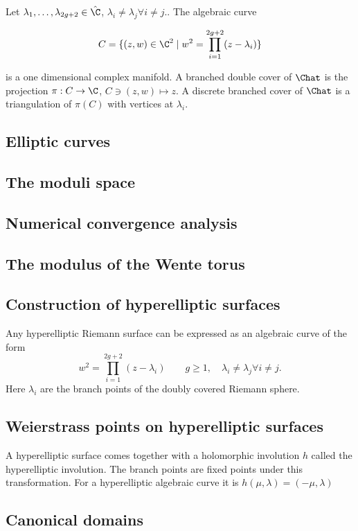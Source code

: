 Let $\lambda_1,\ldots,\lambda_{2g+2}\in \hat{\C}$, $\lambda_i\neq \lambda_j \forall i\neq j.$. The algebraic curve

\begin{equation}
\label{eq:branched_cover}
C=\{(z,w)\in\C^2 \mid w^2 = \prod_{i=1}^{2g+2}(z-\lambda_i)\}
\end{equation}

is a one dimensional complex manifold. A branched double cover of $\Chat$ is the projection $\pi:C\to\C$, $C\ni(z,w)\mapsto z$. A discrete branched cover of $\Chat$ is a triangulation of $\pi(C)$ with vertices at $\lambda_i$.

\subsection{Elliptic curves}
\subsection{The moduli space}
\subsection{Numerical convergence analysis}
\subsection{The modulus of the Wente torus}

\subsection{Construction of hyperelliptic surfaces}
Any hyperelliptic Riemann surface can be expressed as an algebraic curve of the form
\[ w^2 = \prod_{i=1}^{2g+2}(z-\lambda_i) \quad\quad g\geq1,\quad \lambda_i\neq \lambda_j \forall i\neq j.\]
Here $\lambda_i$ are the branch points of the doubly covered Riemann sphere.

\subsection{Weierstrass points on hyperelliptic surfaces}
A hyperelliptic surface comes together with a holomorphic involution $h$ called the hyperelliptic involution. The branch points are fixed points under this transformation. For a hyperelliptic algebraic curve it is $h(\mu, \lambda)=(-\mu, \lambda)$

\subsection{Canonical domains}
